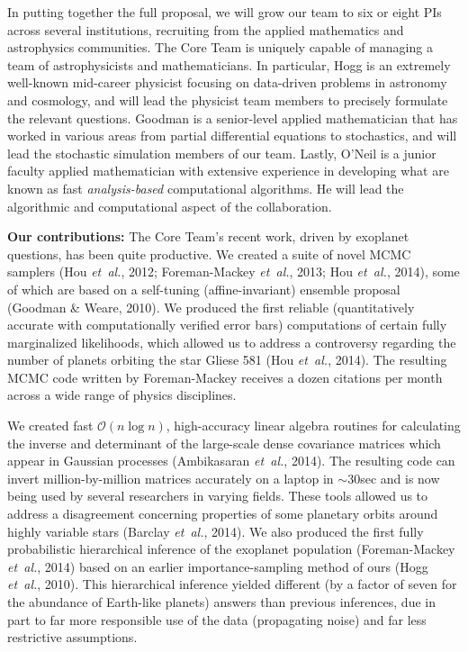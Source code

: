 \documentclass[11pt]{article}
\newcommand{\foreign}[1]{\textsl{#1}}
\newcommand{\etal}{\foreign{et~al.}}
\renewcommand{\paragraph}[1]{\smallskip\par\noindent\textbf{{#1}:}}
\begin{document}
In putting together the full proposal, we will grow our team to six or
eight PIs across several institutions, recruiting from the applied
mathematics and astrophysics communities.
The Core Team is uniquely capable of managing a team of astrophysicists
and mathematicians.
In particular, Hogg is an extremely well-known mid-career physicist
focusing on data-driven problems in astronomy and cosmology, and will
lead the physicist team members to precisely formulate the relevant 
questions.
Goodman is a senior-level applied mathematician that has worked in
various areas from partial differential equations to stochastics,
and will lead the stochastic simulation members of our team.
Lastly, O'Neil is a junior faculty applied mathematician with extensive
experience in developing what are known as fast {\em analysis-based}
computational algorithms.
He will lead the algorithmic and computational aspect of the
collaboration.

\paragraph{Our contributions}
The Core Team's recent work, driven by exoplanet questions,
has been quite productive.
We created a suite of novel MCMC samplers 
(Hou \etal, 2012; Foreman-Mackey \etal, 2013; Hou \etal,
2014), some of which are based on a self-tuning (affine-invariant)
ensemble proposal (Goodman \& Weare, 2010).
We produced the first reliable (quantitatively accurate with
computationally verified error bars) computations of certain fully
marginalized likelihoods, which allowed us to address a controversy
regarding the number of planets orbiting the star Gliese 581 (Hou \etal,
2014).
The resulting MCMC code written by Foreman-Mackey receives a dozen
citations per month across a wide range of physics disciplines.

We created fast $\mathcal O(n \log n)$, high-accuracy linear algebra
routines for calculating the inverse and determinant of the large-scale
dense covariance matrices which appear in Gaussian processes
(Ambikasaran \etal, 2014).
The resulting code can invert million-by-million matrices
accurately on a laptop in $\sim 30$sec and is now being used by
several researchers in varying fields.
These tools allowed us to address a disagreement concerning properties
of some planetary orbits around highly variable stars (Barclay \etal,
2014).
We also produced the first fully probabilistic hierarchical inference of
the exoplanet population (Foreman-Mackey \etal, 2014) based on an
earlier importance-sampling method of ours (Hogg \etal, 2010).
This hierarchical inference yielded different (by a factor of seven for
the abundance of Earth-like planets) answers than previous inferences,
due in part to far more responsible use of the data (propagating noise)
and far less restrictive assumptions.
\end{document}

